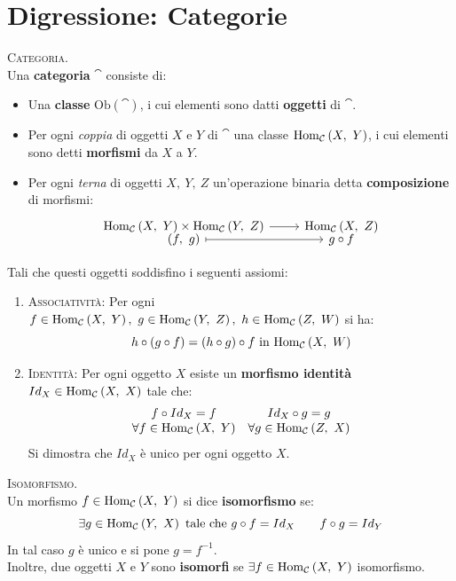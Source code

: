 \section{Digressione: Categorie}
\begin{define}\textsc{Categoria.}\\
	Una \textbf{categoria} $\cat$ consiste di:
	\begin{itemize}
		\item Una \textbf{classe} $\mathrm{Ob}\left(\cat\right)$, i cui elementi sono datti \textbf{oggetti} di $\cat$.
		\item Per ogni \textit{coppia} di oggetti $X$ e $Y$ di $\cat$ una classe $\mathrm{Hom}_{\mathcal{C}}\left(X,\ Y\right)$, i cui elementi sono detti \textbf{morfismi} da $X$ a $Y$.
		\item Per ogni \textit{terna} di oggetti $X,\ Y,\ Z$ un'operazione binaria detta \textbf{composizione} di morfismi:
		\begin{equation}
			\funztot{\ }{\homo{\cat}{X}{Y}\times \homo{\cat}{Y}{Z}}{\homo{\cat}{X}{Z}}{\left(f,\ g\right)}{g\circ f}
		\end{equation}
	\end{itemize}
Tali che questi oggetti soddisfino i seguenti assiomi:
\begin{enumerate}
	\item \textsc{Associatività}: Per ogni $f\in\homo{\cat}{X}{Y},\ g\in\homo{\cat}{Y}{Z},\ h\in\homo{\cat}{Z}{W}$ si ha:
	\begin{equation}
		h\circ\left(g\circ f\right)=\left(h\circ g\right)\circ f\text{ in }\mathrm{Hom}_{\mathcal{C}}\left(X,\ W\right)
	\end{equation}
	\item \textsc{Identità}: Per ogni oggetto $X$ esiste un \textbf{morfismo identità} $Id_{X}\in\mathrm{Hom}_{\mathcal{C}}\left(X,\ X\right)$ tale che:
	\begin{equation}
		\begin{array}{cc}
			f\circ Id_X=f&Id_X\circ g=g\\
			\forall f\in\mathrm{Hom}_{\mathcal{C}}\left(X,\ Y\right)&\forall g\in\mathrm{Hom}_{\mathcal{C}}\left(Z,\ X\right)
		\end{array}
	\end{equation}
Si dimostra che $Id_X$ è unico per ogni oggetto $X$.
\end{enumerate}
\vspace{-3mm}
\end{define}
\begin{define}\textsc{Isomorfismo.}\\
	Un morfismo $f\in\mathrm{Hom}_{\mathcal{C}}\left(X,\ Y\right)$ si dice \textbf{isomorfismo} se:
	\begin{equation}
		 \exists g\in \mathrm{Hom}_{\mathcal{C}}\left(Y,\ X\right) \text{ tale che } g\circ f=Id_X\qquad f\circ g=Id_Y
	\end{equation}
In tal caso $g$ è unico e si pone $g=f^{-1}$.\\
Inoltre, due oggetti $X$ e $Y$ sono \textbf{isomorfi} se $\exists f\in \mathrm{Hom}_{\mathcal{C}}\left(X,\ Y\right)$ isomorfismo.
\end{define}
